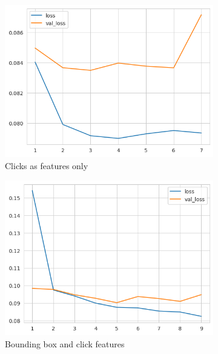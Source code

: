 \begin{figure}[htbp!]
  \centering
  \begin{subfigure}[b]{0.45\textwidth}
    \centering
    \includegraphics[width=\textwidth]{graphics/model_history_loss_clicks}
    \caption{Clicks as features only}
    \label{fig:model_history_loss_clicks}
  \end{subfigure}
  \hfill
  \begin{subfigure}[b]{0.45\textwidth}
    \centering
    \includegraphics[width=\textwidth]{graphics/model_history_loss_features}
    \caption{Bounding box and click features}
    \label{fig:model_history_loss_features}
  \end{subfigure}
  \hfill
  \begin{subfigure}[b]{0.8\textwidth}

\end{subfigure}
\end{figure}
